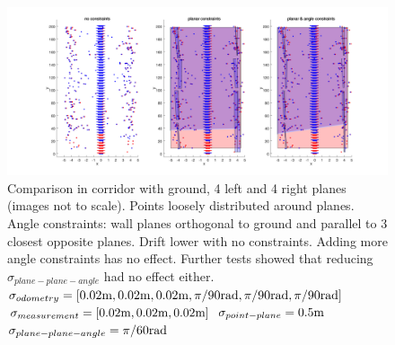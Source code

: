 \documentclass[a4paper,11pt]{article}
\begin{document}
\begin{figure}
\centering
\includegraphics[width=1.15\textwidth,trim={3cm 0 0 0},clip]{connectedSegmentedCorridorHighNoise.png}
\caption{\label{fig:connectedSegmentedCorridorHighNoise} Comparison in corridor with ground, 4 left and 4 right planes (images not to scale). Points loosely distributed around planes. Angle constraints: wall planes orthogonal to ground and parallel to 3 closest opposite planes. Drift lower with no constraints. Adding more angle constraints has no effect. Further tests showed that reducing $\sigma_{plane-plane-angle}$ had no effect either. \newline
$\sigma_{odometry} = [0.02\textnormal{m},0.02\textnormal{m},0.02\textnormal{m},
\pi/90\textnormal{rad},\pi/90\textnormal{rad},\pi/90\textnormal{rad}]$\newline
$\sigma_{measurement} = [0.02\textnormal{m},0.02\textnormal{m},0.02\textnormal{m}]$\newline
$\sigma_{point-plane} = 0.5\textnormal{m}$\newline
$\sigma_{plane-plane-angle} = \pi/60\textnormal{rad}$}
\end{figure}
\end{document}
